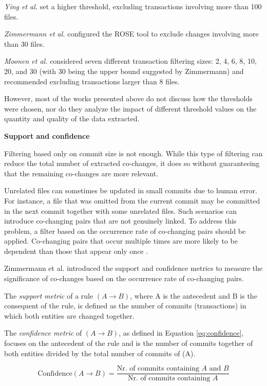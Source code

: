 \textit{Ying et al.} \cite{Ying-co-change} set a higher threshold, excluding transactions involving more than 100 files.

\textit{Zimmermann et al.} \cite{Zimmermann:2004:MVH:998675.999460} configured the ROSE tool to exclude changes involving more than 30 files.

\textit{Moonen et al.} \cite{Moonen-commit} considered seven different transaction filtering sizes: 2, 4, 6, 8, 10, 20, and 30 (with 30 being the upper bound suggested by Zimmermann) and recommended excluding transactions larger than 8 files.

However, most of the works presented above do not discuss how the thresholds were chosen, nor do they analyze the impact of different threshold values on the quantity and quality of the data extracted.


\textbf{Support and confidence}

Filtering based only on commit size is not enough. While this type of filtering can reduce the total number of extracted co-changes, it does so without guaranteeing that the remaining co-changes are more relevant.

Unrelated files can sometimes be updated in small commits due to human error. For instance, a file that was omitted from the current commit may be committed in the next commit together with some unrelated files. Such scenarios can introduce co-changing pairs that are not genuinely linked. To address this problem, a filter based on the occurrence rate of co-changing pairs should be applied. Co-changing pairs that occur multiple times are more likely to be dependent than those that appear only once \cite{b4}.

Zimmermann et al. \cite{Zimmermann:2004:MVH:998675.999460, Zimmermannj2003} introduced the support and confidence metrics to measure the significance of co-changes based on the occurrence rate of co-changing pairs.

The \textit{support metric} of a rule $(A \rightarrow B)$, where A is the antecedent and B is the consequent of the rule, is defined as the number of commits (transactions) in which both entities are changed together.

The \textit{confidence metric} of $(A \rightarrow B)$, as defined in Equation \eqref{eq:confidence}, focuses on the antecedent of the rule and is the number of commits together of both entities divided by the total number of commits of (A).

\begin{equation}
\text{Confidence}(A \rightarrow B) = \frac{\text{Nr. of commits containing } A \text{ and } B}{\text{Nr. of commits containing } A}
\label{eq:confidence}
\end{equation}



